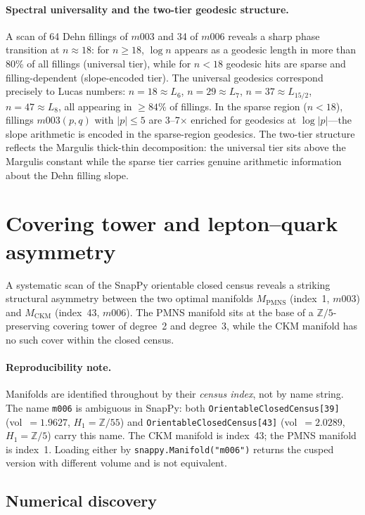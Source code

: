 ﻿\documentclass[12pt]{article}
\theoremstyle{definition}
\begin{document}
\paragraph{Spectral universality and the two-tier geodesic structure.}
A scan of 64 Dehn fillings of $m003$ and 34 of $m006$ reveals a sharp
phase transition at $n \approx 18$: for $n \geq 18$, $\log n$ appears
as a geodesic length in more than 80\% of all fillings (universal tier),
while for $n < 18$ geodesic hits are sparse and filling-dependent
(slope-encoded tier). The universal geodesics correspond precisely to
Lucas numbers: $n = 18 \approx L_6$, $n = 29 \approx L_7$,
$n = 37 \approx L_{15/2}$, $n = 47 \approx L_8$, all appearing in
$\geq 84\%$ of fillings. In the sparse region ($n < 18$), fillings
$m003(p,q)$ with $|p| \leq 5$ are 3--7$\times$ enriched for geodesics
at $\log|p|$---the slope arithmetic is encoded in the sparse-region
geodesics. The two-tier structure reflects the Margulis thick-thin
decomposition: the universal tier sits above the Margulis constant
while the sparse tier carries genuine arithmetic information about the
Dehn filling slope.


\section{Covering tower and lepton--quark asymmetry}
\label{sec:covering_tower}

A systematic scan of the SnapPy orientable closed census reveals
a striking structural asymmetry between the two optimal manifolds
$M_\text{PMNS}$ (index~1, $m003$) and $M_\text{CKM}$ (index~43, $m006$).
The PMNS manifold sits at the base of a $\mathbb{Z}/5$-preserving
covering tower of degree~2 and degree~3, while the CKM manifold
has no such cover within the closed census.

\paragraph{Reproducibility note.}
Manifolds are identified throughout by their \emph{census index}, not
by name string. The name \texttt{m006} is ambiguous in SnapPy: both
\texttt{OrientableClosedCensus[39]} (vol~$=1.9627$, $H_1=\mathbb{Z}/55$)
and \texttt{OrientableClosedCensus[43]} (vol~$=2.0289$, $H_1=\mathbb{Z}/5$)
carry this name. The CKM manifold is index~43; the PMNS manifold is index~1.
Loading either by \texttt{snappy.Manifold("m006")} returns the cusped version
with different volume and is not equivalent.

\subsection{Numerical discovery}
\end{document}
